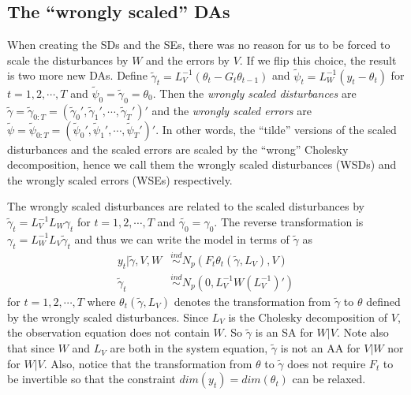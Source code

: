 \documentclass{article}
\begin{document}
\subsection{The ``wrongly scaled'' DAs}
When creating the SDs and the SEs, there was no reason for us to be forced to scale the disturbances by $W$ and the errors by $V$. If we flip this choice, the result is two more new DAs. Define $\tilde{\gamma}_t=L_V^{-1}(\theta_t - G_t\theta_{t-1})$ and $\tilde{\psi}_t=L_W^{-1}(y_t - \theta_t)$ for $t=1,2,\cdots,T$ and $\tilde{\psi}_0=\tilde{\gamma}_0=\theta_0$. Then the {\it wrongly scaled disturbances} are $\tilde{\gamma}=\tilde{\gamma}_{0:T}=(\tilde{\gamma}_0',\tilde{\gamma}_1',\cdots,\tilde{\gamma}_T')'$ and the {\it wrongly scaled errors} are $\tilde{\psi}=\tilde{\psi}_{0:T}=(\tilde{\psi}_0',\tilde{\psi}_1',\cdots,\tilde{\psi}_T')'$. In other words, the ``tilde'' versions of the scaled disturbances and the scaled errors are scaled by the ``wrong'' Cholesky decomposition, hence we call them the wrongly scaled disturbances (WSDs) and the wrongly scaled errors (WSEs) respectively. 

The wrongly scaled disturbances are related to the scaled disturbances by $\tilde{\gamma}_t = L_V^{-1}L_W\gamma_t$ for $t=1,2,\cdots,T$ and $\tilde{\gamma_0}=\gamma_0$. The reverse transformation is $\gamma_t = L_W^{-1}L_V\tilde{\gamma}_t$ and thus we can write the model in terms of $\tilde{\gamma}$ as
\begin{align*}
  y_t|\tilde{\gamma},V,W & \stackrel{ind}{\sim} N_p\left(F_t\theta_t(\tilde{\gamma},L_V), V\right)\\
  \tilde{\gamma}_t & \stackrel{ind}{\sim}N_p(0,L_V^{-1}W(L_V^{-1})')
\end{align*}
for $t=1,2,\cdots,T$ where $\theta_t(\tilde{\gamma},L_V)$ denotes the transformation from $\tilde{\gamma}$ to $\theta$ defined by the wrongly scaled disturbances. Since $L_V$ is the Cholesky decomposition of $V$, the observation equation does not contain $W$. So $\tilde{\gamma}$ is an SA for $W|V$. Note also that since $W$ and $L_V$ are both in the system equation, $\tilde{\gamma}$ is not an AA for $V|W$ nor for $W|V$. Also, notice that the transformation from $\theta$ to $\tilde{\gamma}$ does not require $F_t$ to be invertible so that the constraint $dim(y_t)=dim(\theta_t)$ can be relaxed.
\end{document}
